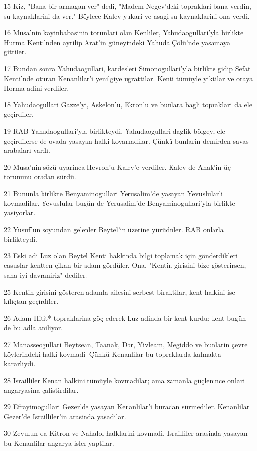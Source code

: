 \par 15 Kiz, "Bana bir armagan ver" dedi, "Madem Negev'deki topraklari bana verdin, su kaynaklarini da ver." Böylece Kalev yukari ve asagi su kaynaklarini ona verdi.
\par 16 Musa'nin kayinbabasinin torunlari olan Kenliler, Yahudaogullari'yla birlikte Hurma Kenti'nden ayrilip Arat'in güneyindeki Yahuda Çölü'nde yasamaya gittiler.
\par 17 Bundan sonra Yahudaogullari, kardesleri Simonogullari'yla birlikte gidip Sefat Kenti'nde oturan Kenanlilar'i yenilgiye ugrattilar. Kenti tümüyle yiktilar ve oraya Horma adini verdiler.
\par 18 Yahudaogullari Gazze'yi, Askelon'u, Ekron'u ve bunlara bagli topraklari da ele geçirdiler.
\par 19 RAB Yahudaogullari'yla birlikteydi. Yahudaogullari daglik bölgeyi ele geçirdilerse de ovada yasayan halki kovamadilar. Çünkü bunlarin demirden savas arabalari vardi.
\par 20 Musa'nin sözü uyarinca Hevron'u Kalev'e verdiler. Kalev de Anak'in üç torununu oradan sürdü.
\par 21 Bununla birlikte Benyaminogullari Yerusalim'de yasayan Yevuslular'i kovmadilar. Yevuslular bugün de Yerusalim'de Benyaminogullari'yla birlikte yasiyorlar.
\par 22 Yusuf'un soyundan gelenler Beytel'in üzerine yürüdüler. RAB onlarla birlikteydi.
\par 23 Eski adi Luz olan Beytel Kenti hakkinda bilgi toplamak için gönderdikleri casuslar kentten çikan bir adam gördüler. Ona, "Kentin girisini bize gösterirsen, sana iyi davraniriz" dediler.
\par 25 Kentin girisini gösteren adamla ailesini serbest biraktilar, kent halkini ise kiliçtan geçirdiler.
\par 26 Adam Hitit* topraklarina göç ederek Luz adinda bir kent kurdu; kent bugün de bu adla aniliyor.
\par 27 Manasseogullari Beytsean, Taanak, Dor, Yivleam, Megiddo ve bunlarin çevre köylerindeki halki kovmadi. Çünkü Kenanlilar bu topraklarda kalmakta kararliydi.
\par 28 Israilliler Kenan halkini tümüyle kovmadilar; ama zamanla güçlenince onlari angaryasina çalistirdilar.
\par 29 Efrayimogullari Gezer'de yasayan Kenanlilar'i buradan sürmediler. Kenanlilar Gezer'de Israilliler'in arasinda yasadilar.
\par 30 Zevulun da Kitron ve Nahalol halklarini kovmadi. Israilliler arasinda yasayan bu Kenanlilar angarya isler yaptilar.
